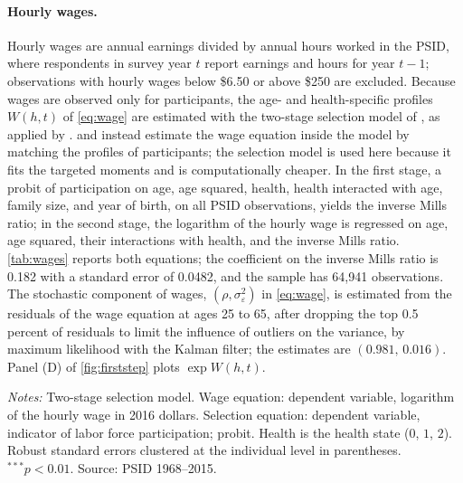 \paragraph{Hourly wages.}
Hourly wages are annual earnings divided by annual hours worked in the PSID, where respondents in survey year $t$ report earnings and hours for year $t-1$; observations with hourly wages below \$6.50 or above \$250 are excluded. %
Because wages are observed only for participants, the age- and health-specific profiles $W(h,t)$ of \eqref{eq:wage} are estimated with the two-stage selection model of \citet{Heckman1976}, as applied by \citet{Guner2012}. %
\citet{french2005effects} and \citet{french2011effects} instead estimate the wage equation inside the model by matching the profiles of participants; the selection model is used here because it fits the targeted moments and is computationally cheaper. %
In the first stage, a probit of participation on age, age squared, health, health interacted with age, family size, and year of birth, on all PSID observations, yields the inverse Mills ratio; in the second stage, the logarithm of the hourly wage is regressed on age, age squared, their interactions with health, and the inverse Mills ratio. %
\autoref{tab:wages} reports both equations; the coefficient on the inverse Mills ratio is 0.182 with a standard error of 0.0482, and the sample has 64,941 observations. %
The stochastic component of wages, $(\rho,\sigma_\varepsilon^2)$ in \eqref{eq:wage}, is estimated from the residuals of the wage equation at ages 25 to 65, after dropping the top 0.5 percent of residuals to limit the influence of outliers on the variance, by maximum likelihood with the Kalman filter; the estimates are $(0.981,\,0.016)$. %
Panel (D) of \autoref{fig:firststep} plots $\exp W(h,t)$.

\begin{table}[!htbp]
\centering
\caption{Estimated Coefficients of the Wage and Selection Equations}
\label{tab:wages}
\vspace{6pt}
\footnotesize
\begin{threeparttable}

\begin{tablenotes}[flushleft]\scriptsize
\item[] \textit{Notes:} Two-stage selection model. Wage equation: dependent variable, logarithm of the hourly wage in 2016 dollars. Selection equation: dependent variable, indicator of labor force participation; probit. Health is the health state ($0$, $1$, $2$). Robust standard errors clustered at the individual level in parentheses. $^{***}p<0.01$. Source: PSID 1968--2015.
\end{tablenotes}
\end{threeparttable}
\end{table}

